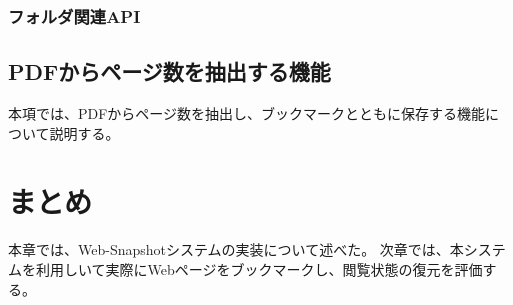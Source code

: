 
\subsubsection{フォルダ関連API}

\subsection{PDFからページ数を抽出する機能}
本項では、PDFからページ数を抽出し、ブックマークとともに保存する機能について説明する。



\section{まとめ}
本章では、Web-Snapshotシステムの実装について述べた。
次章では、本システムを利用しいて実際にWebページをブックマークし、閲覧状態の復元を評価する。